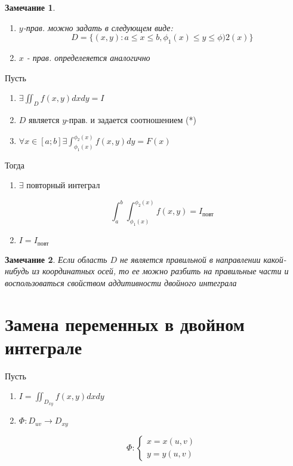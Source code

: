 \documentclass[a4paper, 14pt]{report}
\newtheorem{note}{Замечание}[chapter]
\begin{document}
    \begin{note}
        \begin{enumerate}
            \item $y$-прав. можно задать в следующем виде:
            $$
                D = \{ (x,y) : a \le x \le b, \phi_1(x) \le y \le \phi)2(x) \}
            $$

        \item $x$ - прав. определеяется аналогично
        \end{enumerate}
    \end{note}

    \begin{theorem}
        Пусть 

        \begin{enumerate}
            \item $\exists \iint_D f(x,y) dxdy = I$
            \item $D$ является $y$-прав. и задается соотношением (*)
            \item $\forall x \in [a;b] \exists \int_{\phi_1(x)}^{\phi_2(x)} f(x,y) dy = F(x)$
        \end{enumerate}

        Тогда 

        \begin{enumerate}
            \item $\exists$ повторный интеграл

                $$
                \int^b_a \int_{\phi_1(x)}^{\phi_2(x)} f(x,y) = I_\text{повт}
                $$

            \item $I = I_\text{повт}$
        \end{enumerate}
    \end{theorem}

    \begin{note}
        Если область $D$ не является правильной в направлении какой-нибудь из координатных осей, то ее можно разбить на правильные части и воспользоваться свойством аддитивности двойного интеграла
    \end{note}

    \section{Замена переменных в двойном интеграле}

    Пусть 

    \begin{enumerate}
        \item $I = \iint _{D_{xy}} f(x,y) dxdy$
        \item $\Phi : D_{uv} \to D_{xy}$

            $$
            \Phi : \begin{cases}
                x = x(u,v) \\
                y = y(u,v)
            \end{cases}
            $$
    \end{enumerate}
\end{document}
